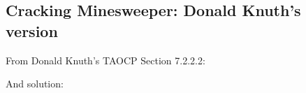 \subsection{Cracking Minesweeper: Donald Knuth's version}

\renewcommand{\CURPATH}{equations/minesweeper/4_Knuth}

From Donald Knuth's \ac{TAOCP} Section 7.2.2.2:

\begin{figure}[H]
\centering
{}
\end{figure}

\begin{figure}[H]
\centering
{}
\end{figure}

And solution:

\begin{figure}[H]
\centering
{}
\end{figure}

\begin{figure}[H]
\centering
{}
\end{figure}

